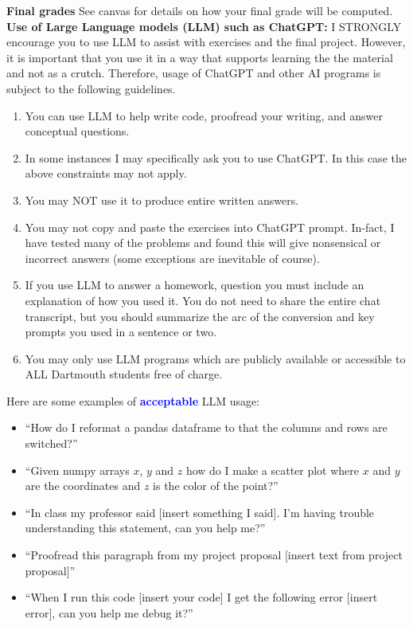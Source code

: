 \noindent
{\bf Final grades} See canvas for details on how your final grade will be computed.   \\

\noindent
{\bf Use of Large Language models (LLM) such as ChatGPT:} I STRONGLY encourage you to use LLM to assist with exercises and the final project. However, it is important that you use it in a way that supports learning the the material and not as a crutch. Therefore, usage of ChatGPT and other AI programs is subject to the following guidelines. 

\begin{enumerate}
\item You can use LLM to help write code, proofread your writing, and answer conceptual questions. 
\item In some instances I may specifically ask you to use ChatGPT. In this case the above constraints may not apply.  
\item You may NOT use it to produce entire written answers. 
\item You may not copy and paste the exercises into ChatGPT prompt. In-fact,  I have tested many of the problems and found this will give nonsensical or incorrect answers (some exceptions are inevitable of course). 
\item  If you use LLM to answer a homework, question you must include an explanation of how you used it. You do not need to share the entire chat transcript, but you should summarize the arc of the conversion and key prompts you used in a sentence or two.
\item You may only use LLM programs which are publicly available or accessible to ALL Dartmouth students free of charge.
\end{enumerate}

Here are some examples of \textcolor{blue}{\bf acceptable} LLM usage: 
\begin{itemize}
\item ``How do I reformat a pandas dataframe to that the columns and rows are switched?''
\item ``Given numpy arrays $x$, $y$ and $z$ how do I make a scatter plot where $x$ and $y$ are the coordinates and $z$ is the color of the point?''
\item ``In class my professor said [insert something I said]. I'm having trouble understanding this statement, can you help me?''
\item ``Proofread this paragraph from my project proposal [insert text from project proposal]'' 
\item ``When I run this code [insert your code] I get the following error [insert error], can you help me debug it?'' 
\end{itemize}

